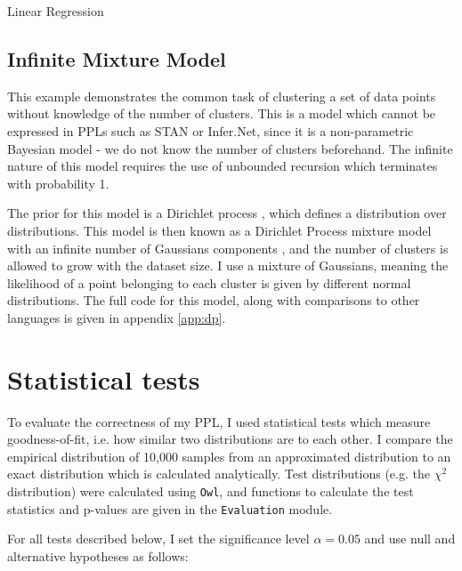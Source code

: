 \begin{listing}[!ht]
	\caption{Linear Regression}
	\label{lst:linreg}
\end{listing}

\subsection{Infinite Mixture Model}
This example demonstrates the common task of clustering a set of data points without knowledge of the number of clusters. This is a model which cannot be expressed in PPLs such as STAN or Infer.Net, since it is a non-parametric Bayesian model - we do not know the number of clusters beforehand. The infinite nature of this model requires the use of unbounded recursion which terminates with probability 1.

The prior for this model is a Dirichlet process \cite{teh2010dirichlet}, which defines a distribution over distributions. This model is then known as a Dirichlet Process mixture model with an infinite number of Gaussians components \cite{dpmm}, and the number of clusters is allowed to grow with the dataset size. I use a mixture of Gaussians, meaning the likelihood of a point belonging to each cluster is given by different normal distributions. The full code for this model, along with comparisons to other languages is given in appendix \ref{app:dp}.




\section{Statistical tests}
To evaluate the correctness of my PPL, I used statistical tests which measure goodness-of-fit, i.e. how similar two distributions are to each other. I compare the empirical distribution of 10,000 samples from an approximated distribution to an exact distribution which is calculated analytically. Test distributions (e.g. the $\chi^2$ distribution) were calculated using \texttt{Owl}, and functions to calculate the test statistics and p-values are given in the \texttt{Evaluation} module.

For all tests described below, I set the significance level $\alpha = 0.05$ and use null and alternative hypotheses as follows:

